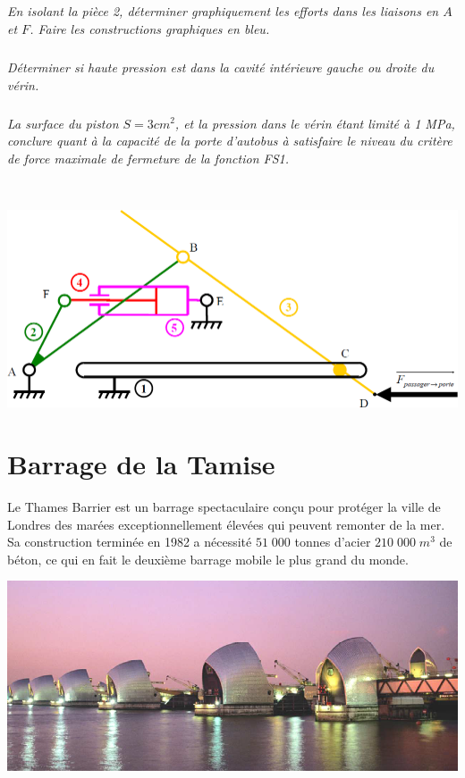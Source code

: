 \documentclass[10pt]{article}
\begin{document}
\subparagraph{}
\textit{En isolant la pièce 2, déterminer graphiquement les efforts dans les liaisons en $A$ et $F$. Faire les constructions graphiques en bleu.}

\subparagraph{}
\textit{Déterminer si haute pression est dans la cavité intérieure gauche ou droite du vérin.}

\subparagraph{}
\textit{La surface du piston $S=3cm^2$, et la pression dans le vérin étant limité à 1 MPa, conclure quant à la capacité de la porte d'autobus à satisfaire le niveau du critère de force maximale de fermeture de la fonction FS1.}

\newpage

 $\;$

\vspace{15cm}

\begin{center}
\includegraphics[width=.9\textwidth]{images/img2.png}
\end{center}

\newpage

\section*{Barrage de la Tamise}
\setcounter{subparagraph}{0}

Le Thames Barrier est un barrage spectaculaire conçu pour protéger la ville de Londres des marées exceptionnellement élevées qui peuvent remonter de la mer. Sa construction terminée en 1982 a nécessité $51\;000$ tonnes d'acier $210\;000 \; m^3$ de béton, ce qui en fait le deuxième barrage mobile le plus grand du monde. 

\begin{center}
\includegraphics[width=.4\textwidth]{images/img3.png}
\end{center}
\end{document}
